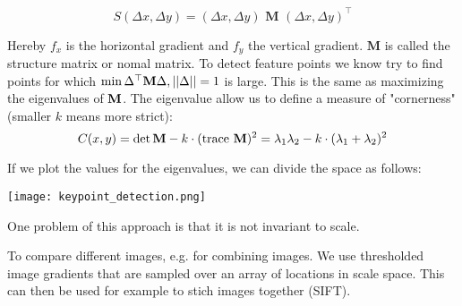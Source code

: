 $$S(\Delta x, \Delta y) = (\Delta x, \Delta y) \textbf{ M } (\Delta x, \Delta y)^\top$$

Hereby $f_x$ is the horizontal gradient and $f_y$ the vertical gradient. $\textbf{M}$ is called the structure matrix or nomal matrix. To detect feature points we know try to find points for which $\min \Delta^\top \textbf M \Delta, || \Delta || = 1 $ is large. This is the same as maximizing the eigenvalues of $\textbf M$. The eigenvalue allow us to define a measure of "cornerness" (smaller $k$ means more strict):
$$C(x,y) = \det \textbf M - k \cdot (\text{trace } \textbf M)^2 = \lambda_1 \lambda_2 - k \cdot (\lambda_1 + \lambda_2)^2$$

If we plot the values for the eigenvalues, we can divide the space as follows:
\begin{center}
	\texttt{[image: keypoint\_detection.png]}
\end{center}

One problem of this approach is that it is not invariant to scale. \medskip

To compare different images, e.g. for combining images. We use thresholded image gradients that are sampled over an array of locations in scale space. This can then be used for example to stich images together (SIFT).






